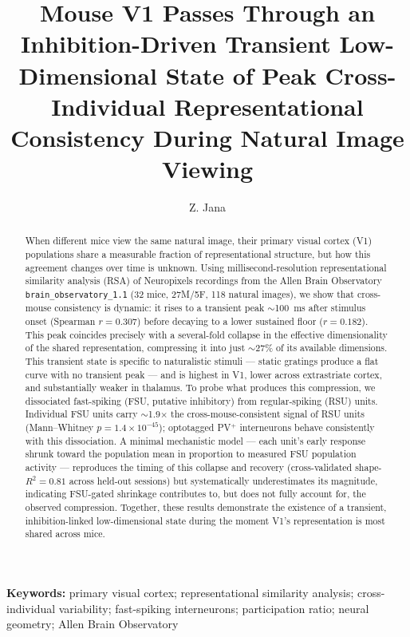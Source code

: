 \documentclass[11pt,onecolumn]{article}
\title{\textbf{Mouse V1 Passes Through an Inhibition-Driven Transient Low-Dimensional 
State of Peak Cross-Individual Representational Consistency During Natural
Image Viewing}}
\author[1]{Z. Jana\orcidlink{0009-0009-3316-7476}}
\affil[1]{Department of Computer Science and Engineering,
The American University in Cairo}
\date{}
\begin{document}
\maketitle

\begin{abstract}

When different mice view the same natural image, their primary visual cortex (V1) populations share a measurable fraction of representational structure, but how this agreement changes over time is unknown. Using millisecond-resolution representational similarity analysis (RSA) of Neuropixels recordings from the Allen Brain Observatory \texttt{brain\_observatory\_1.1} (32 mice, 27M/5F, 118 natural images), we show that cross-mouse consistency is dynamic: it rises to a transient peak $\sim$100~ms after stimulus onset (Spearman $r = 0.307$) before decaying to a lower sustained floor ($r = 0.182$). This peak coincides precisely with a several-fold collapse in the effective dimensionality of the shared representation, compressing it into just $\sim$27\% of its available dimensions. This transient state is specific to naturalistic stimuli --- static gratings produce a flat curve with no transient peak --- and is highest in V1, lower across extrastriate cortex, and substantially weaker in thalamus. To probe what produces this compression, we dissociated fast-spiking (FSU, putative inhibitory) from regular-spiking (RSU) units. Individual FSU units carry $\sim$1.9$\times$ the cross-mouse-consistent signal of RSU units (Mann--Whitney $p = 1.4 \times 10^{-45}$); optotagged PV$^+$ interneurons behave consistently with this dissociation. A minimal mechanistic model — each unit's early response shrunk toward the population mean in proportion to measured FSU population activity — reproduces the timing of this collapse and recovery (cross-validated shape-$R^2 = 0.81$ across held-out sessions) but systematically underestimates its magnitude, indicating FSU-gated shrinkage contributes to, but does not fully account for, the observed compression. Together, these results demonstrate the existence of a transient, inhibition-linked low-dimensional state during the moment V1's representation is most shared across mice.

\end{abstract}

\noindent\textbf{Keywords:} primary visual cortex; representational
similarity analysis; cross-individual variability; fast-spiking
interneurons; participation ratio; neural geometry; Allen Brain
Observatory
\end{document}
